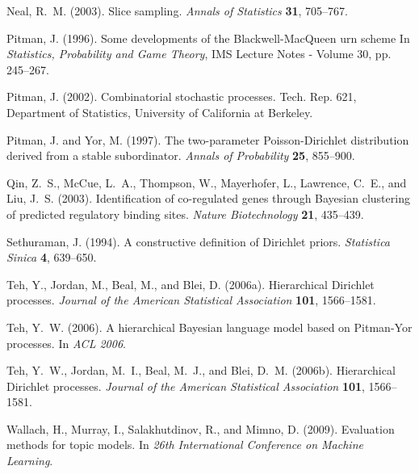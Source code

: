 \documentclass[twoside]{article}
\begin{document}
{\begin{thebibliography}{99}
Neal, R.~M. (2003).
\newblock Slice sampling.
\newblock \emph{Annals of Statistics} \textbf{31}, 705--767.

Pitman, J. (1996).
\newblock Some developments of the Blackwell-MacQueen urn scheme
\newblock In \emph{Statistics, Probability and Game Theory}, IMS Lecture Notes - Volume 30, pp. 245--267.

Pitman, J. (2002).
\newblock Combinatorial stochastic processes.
\newblock Tech. Rep. 621, Department of Statistics, University of California at
  Berkeley.

Pitman, J. and Yor, M. (1997).
\newblock The two-parameter {P}oisson-{D}irichlet distribution derived from a
  stable subordinator.
\newblock \emph{Annals of Probability} \textbf{25}, 855--900.

Qin, Z.~S., McCue, L.~A., Thompson, W., Mayerhofer, L., Lawrence, C.~E., and
  Liu, J.~S. (2003).
\newblock Identification of co-regulated genes through {B}ayesian clustering of
  predicted regulatory binding sites.
\newblock \emph{Nature Biotechnology} \textbf{21}, 435--439.

Sethuraman, J. (1994).
\newblock A constructive definition of {D}irichlet priors.
\newblock \emph{Statistica Sinica} \textbf{4}, 639--650.

Teh, Y., Jordan, M., Beal, M., and Blei, D. (2006{a}).
\newblock Hierarchical {D}irichlet processes.
\newblock \emph{Journal of the American Statistical Association} \textbf{101},
  1566--1581.

Teh, Y.~W. (2006).
\newblock A hierarchical {B}ayesian language model based on {P}itman-{Y}or
  processes.
\newblock In \emph{ACL 2006}.

Teh, Y.~W., Jordan, M.~I., Beal, M.~J., and Blei, D.~M. (2006{b}).
\newblock Hierarchical {D}irichlet processes.
\newblock \emph{Journal of the American Statistical Association} \textbf{101},
  1566--1581.

Wallach, H., Murray, I., Salakhutdinov, R., and Mimno, D. (2009).
\newblock Evaluation methods for topic models.
\newblock In \emph{26th International Conference on Machine
  Learning}.


\end{thebibliography}}
\end{document}
